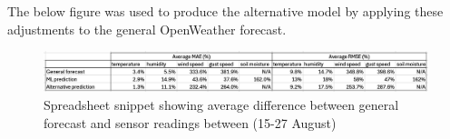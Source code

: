 The below figure was used to produce the alternative model by applying these
adjustments to the general OpenWeather forecast.

\begin{figure}[H]
    \centering
    \includegraphics[width=1\textwidth]{contents/appendix/fig5/rel-mae-rmse.png}
    \caption{Spreadsheet snippet showing average difference between general forecast and sensor readings between (15-27 August)}
    \label{fig:alt-data}
\end{figure}